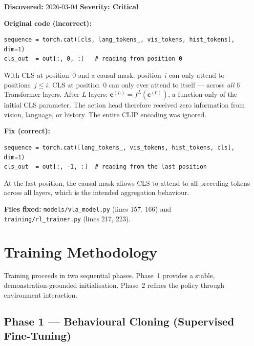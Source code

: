 \documentclass[12pt, a4paper]{article}
\begin{document}
\begin{bugbox}
\textbf{Discovered:} 2026-03-04 \hfill \textbf{Severity: Critical}

\textbf{Original code (incorrect):}
\begin{lstlisting}[style=Python, numbers=none]
sequence = torch.cat([cls, lang_tokens_, vis_tokens, hist_tokens], dim=1)
cls_out  = out[:, 0, :]   # reading from position 0
\end{lstlisting}

With CLS at position~0 and a causal mask, position~$i$ can only attend to
positions~$j \leq i$.
CLS at position~0 can only ever attend to itself — across \emph{all} 6
Transformer layers.
After $L$ layers: $\mathbf{c}^{(L)} = f^L(\mathbf{c}^{(0)})$, a function
only of the initial CLS parameter.
The action head therefore received zero information from vision, language,
or history. The entire CLIP encoding was ignored.

\textbf{Fix (correct):}
\begin{lstlisting}[style=Python, numbers=none]
sequence = torch.cat([lang_tokens_, vis_tokens, hist_tokens, cls], dim=1)
cls_out  = out[:, -1, :]  # reading from the last position
\end{lstlisting}

At the last position, the causal mask allows CLS to attend to all preceding
tokens across all layers, which is the intended aggregation behaviour.

\textbf{Files fixed:} \texttt{models/vla\_model.py} (lines 157, 166) and
\texttt{training/rl\_trainer.py} (lines 217, 223).
\end{bugbox}

\newpage

\section{Training Methodology}
\label{sec:training}

Training proceeds in two sequential phases.
Phase~1 provides a stable, demonstration-grounded initialisation.
Phase~2 refines the policy through environment interaction.

\subsection{Phase 1 — Behavioural Cloning (Supervised Fine-Tuning)}
\end{document}

